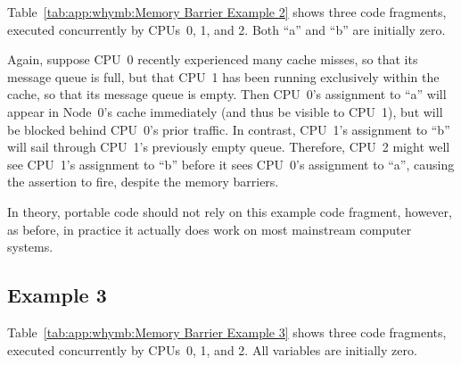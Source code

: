 Table~\ref{tab:app:whymb:Memory Barrier Example 2}
shows three code fragments, executed concurrently by CPUs~0, 1, and 2.
Both ``a'' and ``b'' are initially zero.

\begin{table*}
\small
{}
\caption{Memory Barrier Example 2}
\label{tab:app:whymb:Memory Barrier Example 2}
\end{table*}

Again, suppose CPU~0 recently experienced many cache misses, so that its
message queue is full, but that CPU~1 has been running exclusively within
the cache, so that its message queue is empty.
Then CPU~0's assignment to ``a'' will appear in Node~0's cache
immediately (and thus be visible to CPU~1), but will be blocked behind
CPU~0's prior traffic.
In contrast, CPU~1's assignment to ``b'' will sail through CPU~1's
previously empty queue.
Therefore, CPU~2 might well see CPU~1's assignment to ``b'' before
it sees CPU~0's assignment to ``a'', causing the assertion to fire,
despite the memory barriers.

In theory, portable code should not rely on this example code fragment,
however, as before, in practice it actually does work on most
mainstream computer systems.

\subsection{Example 3}
\label{sec:app:whymb:Example 3}

Table~\ref{tab:app:whymb:Memory Barrier Example 3}
shows three code fragments, executed concurrently by CPUs~0, 1, and 2.
All variables are initially zero.


